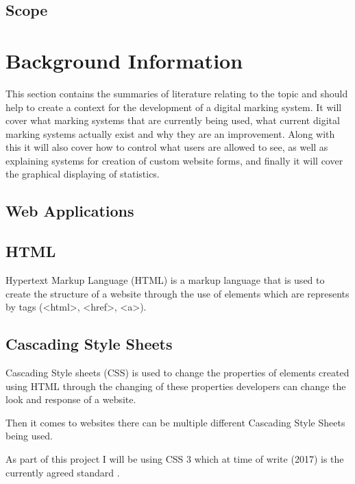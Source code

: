 \documentclass[12pt]{article}  %
\begin{document}
\subsection{Scope}





\newpage
\section{Background Information}
This section contains the summaries of literature relating to the topic and should help to create a context for the development of a digital marking system. It will cover what marking systems that are currently being used, what current digital marking systems actually exist and why they are an improvement. Along with this it will also cover how to control what users are allowed to see, as well as explaining systems for creation of custom website forms, and finally it will cover the graphical displaying of statistics. 


\subsection{Web Applications}

\subsection{HTML}
Hypertext Markup Language (HTML) is a markup language that is used to create the structure of a website through the use of elements which are represents by tags (\textless html\textgreater, \textless href\textgreater, \textless a\textgreater). 

\subsection{Cascading Style Sheets}
Cascading Style sheets (CSS) is used to change the properties of elements created using HTML through the changing of these properties developers can change the look and response of a website. 

 

Then it comes to websites there can be multiple different Cascading Style Sheets being used.  

As part of this project I will be using CSS 3 which at time of write (2017) is the currently agreed standard \cite{noauthor_css_nodate}.
\end{document}
